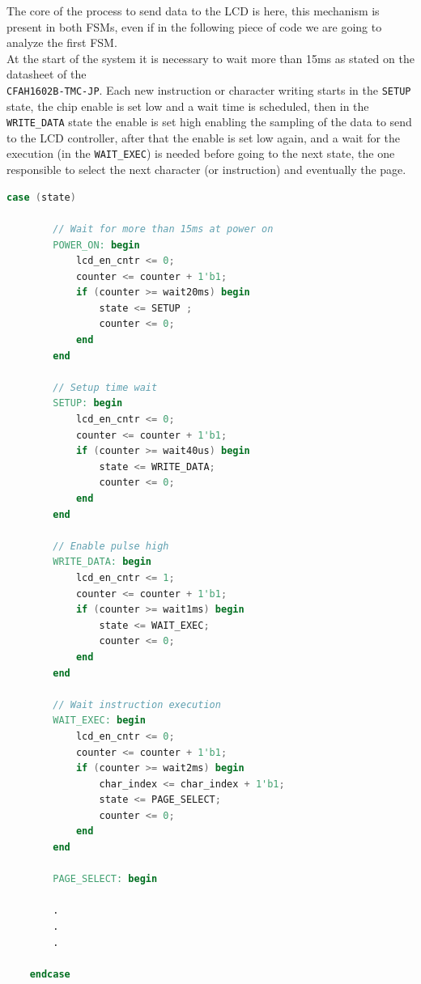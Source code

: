 \newpage
\noindent
The core of the process to send data to the LCD is here, this mechanism is present in both FSMs, even if in the following piece of code we are going to analyze the first FSM. \\
At the start of the system it is necessary to wait more than 15ms as stated on the datasheet of the \\ \texttt{CFAH1602B-TMC-JP}.
Each new instruction or character writing starts in the \texttt{SETUP} state, the chip enable is set low and a wait time is scheduled, then in the \texttt{WRITE\_DATA} state the enable is set high enabling the sampling of the data to send to the LCD controller, after that the enable is set low again, and a wait for the execution (in the \texttt{WAIT\_EXEC}) is needed before going to the next state, the one responsible to select the next character (or instruction) and eventually the page. 

\noindent
\vspace{1cm}
\begin{lstlisting}[language=Verilog, caption=Sending data to LCD ]
    case (state)
    
        // Wait for more than 15ms at power on 
        POWER_ON: begin
            lcd_en_cntr <= 0;
            counter <= counter + 1'b1;
            if (counter >= wait20ms) begin
                state <= SETUP ;
                counter <= 0;
            end				 
        end
        
        // Setup time wait 
        SETUP: begin
            lcd_en_cntr <= 0;
            counter <= counter + 1'b1;
            if (counter >= wait40us) begin 
                state <= WRITE_DATA;
                counter <= 0;
            end
        end

        // Enable pulse high 
        WRITE_DATA: begin
            lcd_en_cntr <= 1;
            counter <= counter + 1'b1;
            if (counter >= wait1ms) begin 
                state <= WAIT_EXEC; 
                counter <= 0;
            end
        end

        // Wait instruction execution 
        WAIT_EXEC: begin
            lcd_en_cntr <= 0;
            counter <= counter + 1'b1;
            if (counter >= wait2ms) begin 
                char_index <= char_index + 1'b1;	
                state <= PAGE_SELECT; 
                counter <= 0;
            end
        end

        PAGE_SELECT: begin

        .
        .
        .
        
    endcase
\end{lstlisting}
\vspace{1cm}

